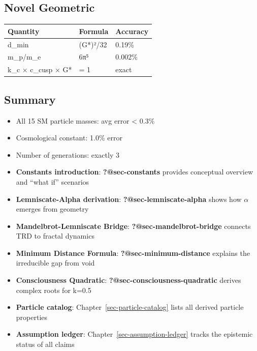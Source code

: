 \documentclass[
  11pt,
  letterpaper,
  twoside,
  openright]{book}
\providecommand{\tightlist}{%
  \setlength{\itemsep}{0pt}\setlength{\parskip}{0pt}}
\begin{document}
\subsection{Novel Geometric}\label{novel-geometric}

\begin{longtable}[]{@{}lll@{}}
\toprule\noalign{}
Quantity & Formula & Accuracy \\
\midrule\noalign{}
\endhead
\bottomrule\noalign{}
\endlastfoot
d\_min & (G*)²/32 & 0.19\% \\
m\_p/m\_e & 6π⁵ & 0.002\% \\
k\_c × c\_cusp × G* & = 1 & exact \\
\end{longtable}

\subsection{Summary}\label{summary-3}

\begin{itemize}
\tightlist
\item
  All 15 SM particle masses: avg error \textless{} 0.3\%
\item
  Cosmological constant: 1.0\% error
\item
  Number of generations: exactly 3
\end{itemize}

\begin{tcolorbox}[enhanced jigsaw, coltitle=black, colbacktitle=quarto-callout-tip-color!10!white, toprule=.15mm, colframe=quarto-callout-tip-color-frame, arc=.35mm, opacityback=0, bottomtitle=1mm, toptitle=1mm, breakable, colback=white, titlerule=0mm, opacitybacktitle=0.6, title=\textcolor{quarto-callout-tip-color}{\faLightbulb}\hspace{0.5em}{Related Topics}, rightrule=.15mm, bottomrule=.15mm, leftrule=.75mm, left=2mm]

\begin{itemize}
\tightlist
\item
  \textbf{Constants introduction}: \textbf{?@sec-constants} provides
  conceptual overview and ``what if'' scenarios
\item
  \textbf{Lemniscate-Alpha derivation}: \textbf{?@sec-lemniscate-alpha}
  shows how \(\alpha\) emerges from geometry
\item
  \textbf{Mandelbrot-Lemniscate Bridge}:
  \textbf{?@sec-mandelbrot-bridge} connects TRD to fractal dynamics
\item
  \textbf{Minimum Distance Formula}: \textbf{?@sec-minimum-distance}
  explains the irreducible gap from void
\item
  \textbf{Consciousness Quadratic}:
  \textbf{?@sec-consciousness-quadratic} derives complex roots for k=0.5
\item
  \textbf{Particle catalog}: Chapter~\ref{sec-particle-catalog} lists
  all derived particle properties
\item
  \textbf{Assumption ledger}: Chapter~\ref{sec-assumption-ledger} tracks
  the epistemic status of all claims
\end{itemize}

\end{tcolorbox}
\end{document}
